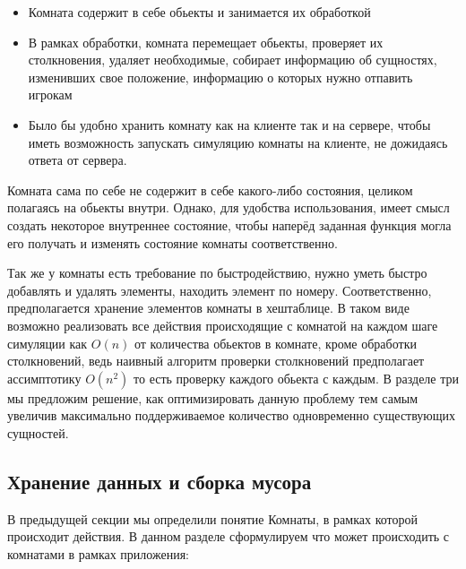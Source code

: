 \documentclass[a4paper,14pt, openany]{book}
\begin{document}
\begin{itemize}
  \item Комната содержит в себе обьекты и занимается их обработкой
  \item В рамках обработки, комната перемещает обьекты, проверяет их столкновения, удаляет необходимые, собирает информацию об сущностях, изменивших свое положение, информацию о которых нужно отпавить игрокам
  \item Было бы удобно хранить комнату как на клиенте так и на сервере, чтобы иметь возможность запускать симуляцию комнаты на клиенте, не дожидаясь ответа от сервера. 
\end{itemize}

Комната сама по себе не содержит в себе какого-либо состояния, целиком полагаясь на обьекты внутри. Однако, для удобства использования, имеет смысл создать некоторое внутреннее состояние, чтобы наперёд заданная функция могла его получать и изменять состояние комнаты соответственно.

Так же у комнаты есть требование по быстродействию, нужно уметь быстро добавлять и удалять элементы, находить элемент по номеру. Соответственно, предполагается хранение элементов комнаты в хештаблице. В таком виде возможно реализовать все действия происходящие с комнатой на каждом шаге симуляции как $O(n) $ от количества обьектов в комнате, кроме обработки столкновений, ведь наивный алгоритм проверки столкновений предполагает ассимптотику $ O(n^2)$ то есть проверку каждого обьекта с каждым. В разделе три мы предложим решение, как оптимизировать данную проблему тем самым увеличив максимально поддерживаемое количество одновременно существующих сущностей.

\subsection{Хранение данных и сборка мусора}

В предыдущей секции мы определили понятие Комнаты, в рамках которой происходит действия. В данном разделе сформулируем что может происходить с комнатами в рамках приложения:
\end{document}
